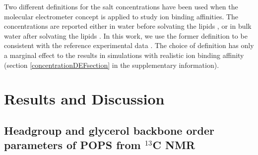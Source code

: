\documentclass[aps,prl,superscriptaddress,twocolumn]{revtex4}
\begin{document}
Two different definitions for the salt concentrations have been used when the molecular
electrometer concept is applied to study ion binding affinities.
The concentrations are reported either in water before solvating the lipids \cite{akutsu81,roux90,catte16},
or in bulk water after solvating the lipids \cite{altenbach84,melcr18}.
In this work, we use the former definition to be consistent with the reference
experimental data \cite{roux90}. The choice of definition has only a marginal effect
to the results in simulations with realistic ion binding affinity
(section \ref{concentrationDEFsection} in the supplementary information).

\section{Results and Discussion}

\subsection{Headgroup and glycerol backbone order parameters of POPS from $^{13}$C NMR}
\end{document}
